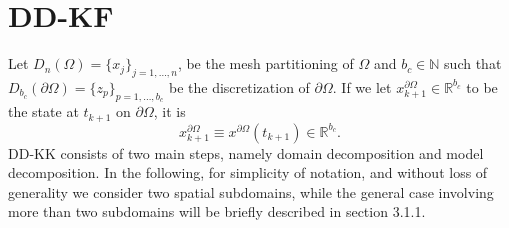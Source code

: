 \documentclass[smallcondensed]{svjour3}
\begin{document}
\section{DD-KF}
 Let  $D_{n}(\Omega)=\{{x}_{j}\}_{j=1,\ldots,n}$, be the mesh partitioning of $\Omega$ and  $b_c\in \mathbb{N}$ such that  $D_{b_c}(\partial \Omega)=\{{z}_{p}\}_{p=1,\ldots,b_c}$ be the discretization of $\partial \Omega$. If we let $x_{k+1}^{\partial \Omega}\in \mathbb{R}^{b_c}$ to be the state at  $t_{k+1}$ on $\partial \Omega$, it is
\begin{equation}
x_{k+1}^{\partial \Omega} \equiv x^{\partial \Omega}(t_{k+1})\in \mathbb{R}^{b_c}.
\end{equation} 
\noindent DD-KK  consists of  two main steps, namely domain decomposition and model decomposition. In the following, for simplicity of notation, and without loss of generality  we consider two spatial subdomains, while  the general case involving more than two subdomains will be briefly described in section 3.1.1. \\[.1cm]
\end{document}
